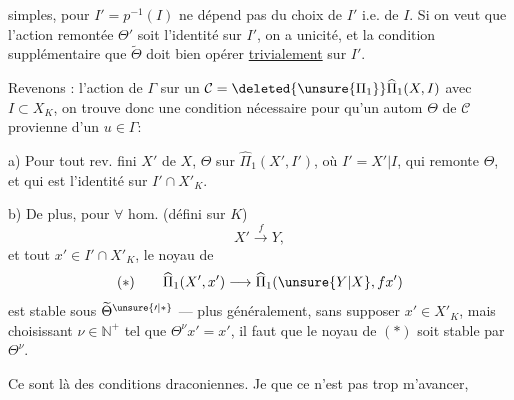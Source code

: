  simples,  pour $I'=p^{-1}(I)$ ne dépend pas du choix de $I'$ i.e. de $I$. Si on veut que l'action remontée $\Theta'$ soit l'identité sur $I'$, on a unicité, et la condition supplémentaire que $\widetilde{\Theta}$ doit bien opérer \uline{trivialement} sur $I'$.

Revenons : l'action de $\Gamma$  sur un $\mathcal{C}=\deleted{\unsure{\Pi_1}}\widehat{\Pi}_1(X,I)$ avec $I\subset X_K$, on trouve donc une condition nécessaire pour qu'un autom $\Theta$ de $\mathcal{C}$  provienne d'un $u\in\Gamma$:

a) Pour tout rev.  fini $X'$ de $X$,     $\Theta$ sur $\widehat{\Pi}_1(X',I')$, où $I'=X'|I$, qui remonte $\Theta$, et qui est l'identité sur $I'\cap X'_K$.

b) De plus, pour $\forall$ hom. (défini sur $K$)
\[
X'\xrightarrow{f}Y,
\]
et tout $x'\in I'\cap X'_K$, le noyau de
\[
(*)\qquad\widehat{\Pi}_1(X',x')\longrightarrow\widehat{\Pi}_1(\unsure{Y|X},f x')
\]
est stable sous $\widetilde{\Theta}^{\unsure{\prime|*}}$  --- plus généralement, sans supposer $x'\in X'_K$, mais choisissant $\nu\in\mathbb{N}^{+}$ tel que $\Theta^\nu x'=x'$, il faut que \deleted{$\Theta$} le noyau de $(*)$ soit stable par $\Theta^\nu$.

Ce sont là des conditions draconiennes. Je  que ce n'est pas trop m'avancer,

